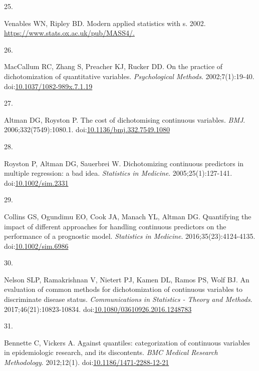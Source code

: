 \documentclass[
]{book}
\newlength{\cslhangindent}
\newlength{\csllabelwidth}
\newlength{\cslentryspacingunit} %
\newenvironment{CSLReferences}[2] %
 {%
  \setlength{\parindent}{0pt}
  \ifodd #1
  \let\oldpar\par
  \def\par{\hangindent=\cslhangindent\oldpar}
  \fi
  \setlength{\parskip}{#2\cslentryspacingunit}
 }%
 {}
\newcommand{\CSLLeftMargin}[1]{\parbox[t]{\csllabelwidth}{#1}}
\newcommand{\CSLRightInline}[1]{\parbox[t]{\linewidth - \csllabelwidth}{#1}\break}
\begin{document}
\begin{CSLReferences}{0}{0}
\leavevmode{}%
\CSLLeftMargin{25. }%
\CSLRightInline{Venables WN, Ripley BD. Modern applied statistics with s. 2002. \href{https://www.stats.ox.ac.uk/pub/MASS4/}{https://www.stats.ox.ac.uk/pub/MASS4/.}}

\leavevmode{}%
\CSLLeftMargin{26. }%
\CSLRightInline{MacCallum RC, Zhang S, Preacher KJ, Rucker DD. On the practice of dichotomization of quantitative variables. \emph{Psychological Methods}. 2002;7(1):19-40. doi:\href{https://doi.org/10.1037/1082-989x.7.1.19}{10.1037/1082-989x.7.1.19}}

\leavevmode{}%
\CSLLeftMargin{27. }%
\CSLRightInline{Altman DG, Royston P. The cost of dichotomising continuous variables. \emph{BMJ}. 2006;332(7549):1080.1. doi:\href{https://doi.org/10.1136/bmj.332.7549.1080}{10.1136/bmj.332.7549.1080}}

\leavevmode{}%
\CSLLeftMargin{28. }%
\CSLRightInline{Royston P, Altman DG, Sauerbrei W. Dichotomizing continuous predictors in multiple regression: a bad idea. \emph{Statistics in Medicine}. 2005;25(1):127-141. doi:\href{https://doi.org/10.1002/sim.2331}{10.1002/sim.2331}}

\leavevmode{}%
\CSLLeftMargin{29. }%
\CSLRightInline{Collins GS, Ogundimu EO, Cook JA, Manach YL, Altman DG. Quantifying the impact of different approaches for handling continuous predictors on the performance of a prognostic model. \emph{Statistics in Medicine}. 2016;35(23):4124-4135. doi:\href{https://doi.org/10.1002/sim.6986}{10.1002/sim.6986}}

\leavevmode{}%
\CSLLeftMargin{30. }%
\CSLRightInline{Nelson SLP, Ramakrishnan V, Nietert PJ, Kamen DL, Ramos PS, Wolf BJ. An evaluation of common methods for dichotomization of continuous variables to discriminate disease status. \emph{Communications in Statistics - Theory and Methods}. 2017;46(21):10823-10834. doi:\href{https://doi.org/10.1080/03610926.2016.1248783}{10.1080/03610926.2016.1248783}}

\leavevmode{}%
\CSLLeftMargin{31. }%
\CSLRightInline{Bennette C, Vickers A. Against quantiles: categorization of continuous variables in epidemiologic research, and its discontents. \emph{BMC Medical Research Methodology}. 2012;12(1). doi:\href{https://doi.org/10.1186/1471-2288-12-21}{10.1186/1471-2288-12-21}}


\end{CSLReferences}
\end{document}
